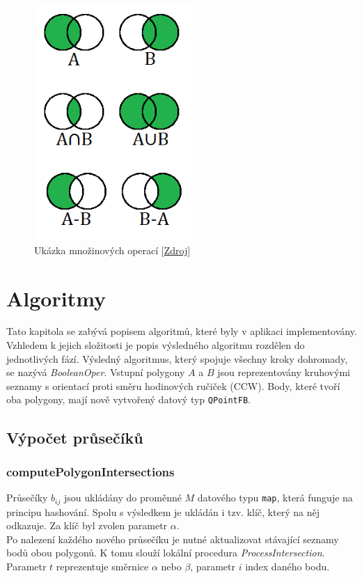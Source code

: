 \documentclass[a4paper, 12pt]{article}
\begin{document}
\begin{figure}[h!]
	\centering
	\includegraphics[width=6cm]{./pictures/operations.png}
	\caption{Ukázka množinových operací [\href{http://www.efgh.com/math/algebra/sets.htm}{Zdroj}]}
\end{figure}

\section{Algoritmy}
Tato kapitola se zabývá popisem algoritmů, které byly v aplikaci implementovány. Vzhledem k jejich složitosti je popis výsledného algoritmu rozdělen do jednotlivých fází. Vý\-sled\-ný algoritmus, který spojuje všechny kroky dohromady, se nazývá \textit{BooleanOper}. Vstupní polygony $A$ a $B$ jsou reprezentovány kruhovými seznamy s orientací proti směru hodinových ručiček (CCW). Body, které tvoří oba polygony, mají nově vytvořený datový typ \texttt{QPointFB}.

\subsection{Výpočet průsečíků}
\subsubsection{computePolygonIntersections}
Průsečíky $b_{ij}$ jsou ukládány do proměnné $M$ datového typu \texttt{map}, která funguje na principu hashování. Spolu s výsledkem je ukládán i tzv. klíč, který na něj odkazuje. Za klíč byl zvolen parametr $\alpha$.\\

Po nalezení každého nového průsečíku je nutné aktualizovat stávající seznamy bodů obou polygonů. K tomu slouží lokální procedura \textit{ProcessIntersection}. Parametr $t$ reprezentuje směrnice $\alpha$ nebo $\beta$, parametr $i$ index daného bodu.\\
\end{document}
